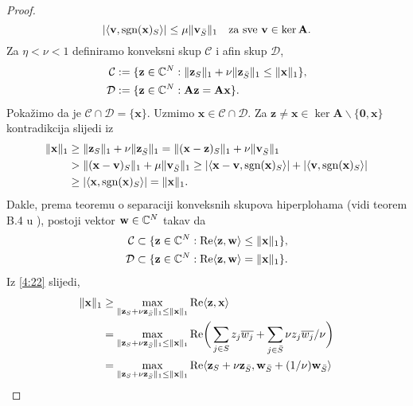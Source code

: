 \documentclass[a4paper,twoside,12pt]{memoir} %
\newcommand{\vect}[1]{\mathbf{#1}}
\renewcommand{\vec}{\vect}
\newcommand{\norm}[1]{\|{#1}\|}
\newcommand{\sgn}{\text{\normalfont{sgn}}}
\renewcommand{\Re}{\text{\normalfont{Re}}}
\begin{document}
\begin{proof}
\begin{equation*}
        |\langle \vec v, \sgn(\vec x)_S \rangle|  \leq \mu\norm{\vec v_{\bar S}}_1 \quad \text{za sve } \vec v \in \ker \vec A.
    \end{equation*}
    Za $\eta < \nu < 1$ definiramo konveksni skup $\mathcal{C}$ i afin skup $\mathcal{D}$,
    \begin{align*}
        \mathcal{C} &:= \{ \vec z \in \C^N : \norm{\vec z_S}_1 + \nu \norm{\vec z_{\bar S}}_1 \leq \norm{\vec x}_1 \},\\
        \mathcal{D} &:= \{ \vec z \in \C^N : \vec{Az} = \vec{Ax} \}.
    \end{align*}
    Poka\v{z}imo da je $\mathcal{C} \cap \mathcal{D} = \{\vec x\}$. Uzmimo $\vec x \in \mathcal{C} \cap \mathcal{D}$. Za $ \vec z \neq \vec x \in \ker \vec A \backslash \{\vec 0, \vec x  \}$ kontradikcija slijedi iz
    \begin{align*}
        \norm{\vec x}_1 &\geq \norm{\vec z_S}_1 + \nu \norm{\vec z_{\bar S}}_1 = \norm{(\vec x - \vec z)_S}_1 + \nu \norm{\vec v_{\bar S}}_1\\
        &> \norm{(\vec x - \vec v)_S}_1 + \mu \norm{\vec v_{\bar S}}_1 \geq |\langle \vec x - \vec v, \sgn(\vec x)_S \rangle| + |\langle \vec v, \sgn(\vec x)_S \rangle|\\
        &\geq |\langle \vec x, \sgn(\vec x)_S \rangle| = \norm{\vec x}_1.
    \end{align*}
    Dakle, prema teoremu o separaciji konveksnih skupova hiperplohama (vidi teorem B.4 u \cite{foucart13}), postoji vektor $\vec w \in \C^N$ takav da
    \begin{align}
        \mathcal{C} \subset \{ \vec z \in \C^N: \Re \langle \vec z, \vec w \rangle \leq \norm{\vec x}_1 \}\label{4:22},\\
        \mathcal{D} \subset \{ \vec z \in \C^N: \Re \langle \vec z, \vec w \rangle = \norm{\vec x}_1 \}\label{4:23}.
    \end{align}
    Iz \eqref{4:22} slijedi, 
    \begin{align*}
        \norm{\vec x}_1 &\geq \max_{\norm{\vec z_S + \nu \vec z_{\bar S}}_1 \leq \norm{\vec x}_1} \Re \langle \vec z, \vec x\rangle \\
        &=\max_{\norm{\vec z_S + \nu \vec z_{\bar S}}_1 \leq \norm{\vec x}_1} \Re \bigg( \sum_{j \in S} z_j \overline{w_j} + \sum_{j \in \bar S} \nu z_j \overline{w_j}/ \nu \bigg)\\
        &= \max_{\norm{\vec z_S + \nu \vec z_{\bar S}}_1 \leq \norm{\vec x}_1} \Re \langle \vec z_S + \nu \vec z_{\bar S}, \vec w_{\bar S} + (1/\nu) \vec w_{\bar S} \rangle \\

\end{align*}
\end{proof}
\end{document}
